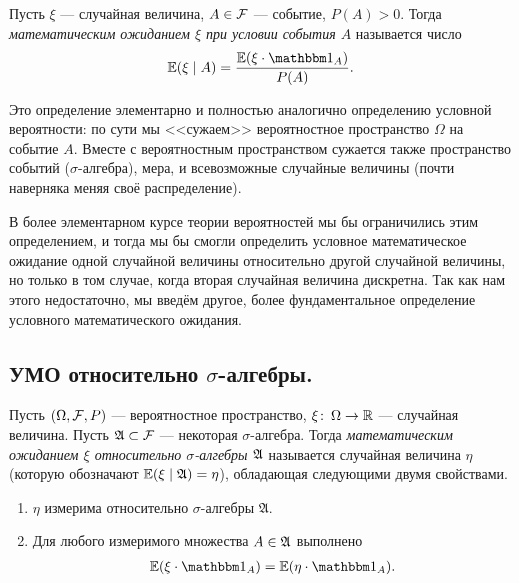\documentclass[../main.tex]{subfiles}
\begin{document}
 \begin{df}
  Пусть $ \xi $  --- случайная величина, $ A \in \mathcal F $  --- событие, $ P(A) > 0 $. Тогда \textit{математическим ожиданием $ \xi $ при условии события $ A $} называется число
  \begin{align*}
   \E(\xi \mid A) = \frac{\E (\xi \cdot \Ind_A)}{P(A)}.
  \end{align*}
 \end{df}

 Это определение элементарно и полностью аналогично определению условной вероятности: по сути мы <<сужаем>> вероятностное пространство $ \Omega $ на событие $ A $. Вместе с вероятностным пространством сужается также пространство событий ($ \sigma $-алгебра), мера, и всевозможные случайные величины (почти наверняка меняя своё распределение).

 В более элементарном курсе теории вероятностей мы бы ограничились этим определением, и тогда мы бы смогли определить условное математическое ожидание одной случайной величины относительно другой случайной величины, но только в том случае, когда вторая случайная величина дискретна. Так как нам этого недостаточно, мы введём другое, более фундаментальное определение условного математического ожидания.

 \subsection{УМО относительно \texorpdfstring{$\sigma$}{sigma}-алгебры.}

 \begin{df}
  \label{df:umo}
  Пусть $ (\Omega, \mathcal F, P) $ --- вероятностное пространство, $ \xi \colon \, \Omega \to \mathbb{R} $ --- случайная величина. Пусть $ \mathfrak A \subset \mathcal F $ --- некоторая $ \sigma $-алгебра. Тогда \textit{математическим ожиданием $ \xi $ относительно $ \sigma $-алгебры $ \mathfrak A $} называется случайная величина $ \eta $ (которую обозначают $ \mathbb E(\xi \mid \mathfrak A) = \eta $), обладающая следующими двумя свойствами.
  \begin{enumerate}
   \item $ \eta $ измерима относительно $ \sigma $-алгебры $ \mathfrak A $.
   \item Для любого измеримого множества $ A \in \mathfrak A $ выполнено
    \begin{align}
     \label{eq:def:umo}
     \E(\xi \cdot \Ind_A) = \E(\eta \cdot \Ind_A).
    \end{align}
  \end{enumerate}
 \end{df}
\end{document}
